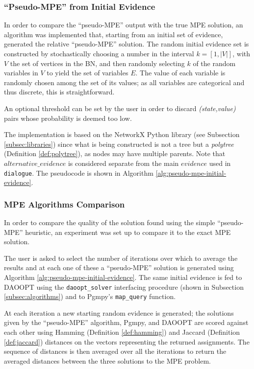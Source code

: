 \subsubsection{\enquote{Pseudo-MPE} from Initial Evidence} \label{subsubsec:pseudo-mpe}
In order to compare the \enquote{pseudo-MPE} output with the true MPE solution, an algorithm was implemented that, starting from an initial set of evidence, generated the relative \enquote{pseudo-MPE} solution.
The random initial evidence set is constructed by stochastically choosing a number in the interval $k = [ 1, |V| ]$, with $V$ the set of vertices in the BN, and then randomly selecting $k$ of the random variables in $V$ to yield the set of variables $E$.
The value of each variable is randomly chosen among the set of its values; as all variables are categorical and thus discrete, this is straightforward.

An optional threshold can be set by the user in order to discard \textit{(state,value)} pairs whose probability is deemed too low.

The implementation is based on the NetworkX Python library (see Subsection \ref{subsec:libraries}) since what is being constructed is not a tree but a \textit{polytree} (Definition \ref{def:polytree}), as nodes may have multiple parents.
Note that $alternative\_evidence$ is considered separate from the main $evidence$ used in \texttt{dialogue}.
The pseudocode is shown in Algorithm \ref{alg:pseudo-mpe-initial-evidence}.

\subsubsection{MPE Algorithms Comparison}
In order to compare the quality of the solution found using the simple \enquote{pseudo-MPE} heuristic, an experiment was set up to compare it to the exact MPE solution.

The user is asked to select the number of iterations over which to average the results and at each one of these a \enquote{pseudo-MPE} solution is generated using Algorithm \ref{alg:pseudo-mpe-initial-evidence}.
The same initial evidence is fed to DAOOPT using the \texttt{daoopt\_solver} interfacing procedure (shown in Subsection \ref{subsec:algorithms}) and to Pgmpy's \texttt{map\_query} function.

At each iteration a new starting random evidence is generated; the solutions given by the \enquote{pseudo-MPE} algorithm, Pgmpy, and DAOOPT are scored against each other using Hamming (Definition \ref{def:hamming}) and Jaccard (Definition \ref{def:jaccard}) distances on the vectors representing the returned assignments.
The sequence of distances is then averaged over all the iterations to return the averaged distances between the three solutions to the MPE problem.

